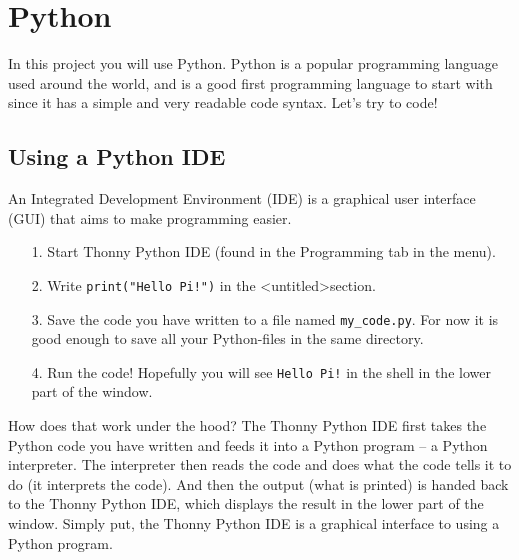 \documentclass{article}
\begin{document}
\section{Python}
In this project you will use Python. Python is a popular programming language used around the world, and is a good first programming language to start with since it has a simple and very readable code syntax. Let's try to code!

\subsection{Using a Python IDE}
An Integrated Development Environment (IDE) is a graphical user interface (GUI) that aims to make programming easier.
\begin{itemize}
    \item[1.] Start Thonny Python IDE (found in the Programming tab in the menu).
    \item[2.] Write \texttt{print("Hello Pi!")} in the \textless untitled\textgreater  section.
    \item[3.] Save the code you have written to a file named \verb!my_code.py!. For now it is good enough to save all your Python-files in the same directory.
    \item[4.] Run the code! Hopefully you will see \texttt{Hello Pi!} in the shell in the lower part of the window.
\end{itemize}
How does that work under the hood? The Thonny Python IDE first takes the Python code you have written and feeds it into a Python program -- a Python interpreter. The interpreter then reads the code and does what the code tells it to do (it interprets the code). And then the output (what is printed) is handed back to the Thonny Python IDE, which displays the result in the lower part of the window.
Simply put, the Thonny Python IDE is a graphical interface to using a Python program.
\end{document}
